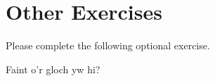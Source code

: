 \documentclass{../../../texmf/camel}
\begin{document}
\section{Other Exercises}

\begin{exercise}
Please complete the following optional exercise.
\begin{questions} 
\question Faint o'r gloch yw hi?
\end{questions}
\end{exercise}
\end{document}

